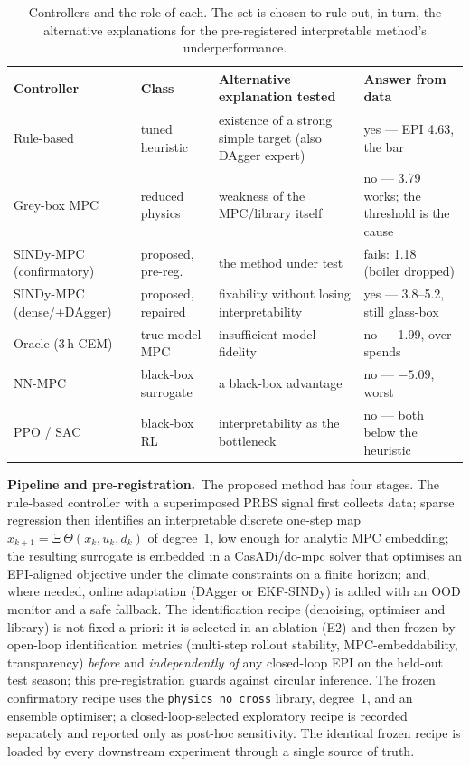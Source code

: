 \documentclass[preprint,3p]{elsarticle}
\begin{document}
\begin{table}[t]
\centering
\caption{Controllers and the role of each. The set is chosen to rule out, in turn, the
alternative explanations for the pre-registered interpretable method's underperformance.}
\label{tab:controllers}
\small
\begin{tabular}{@{}p{3.0cm}p{2.4cm}p{5.2cm}p{4.0cm}@{}}
\toprule
Controller & Class & Alternative explanation tested & Answer from data \\
\midrule
Rule-based & tuned heuristic & existence of a strong simple target (also DAgger expert) & yes --- EPI 4.63, the bar \\
Grey-box MPC & reduced physics & weakness of the MPC/library itself & no --- 3.79 works; the threshold is the cause \\
SINDy-MPC (confirmatory) & proposed, pre-reg. & the method under test & fails: 1.18 (boiler dropped) \\
SINDy-MPC (dense/+DAgger) & proposed, repaired & fixability without losing interpretability & yes --- 3.8--5.2, still glass-box \\
Oracle (3\,h CEM) & true-model MPC & insufficient model fidelity & no --- 1.99, over-spends \\
NN-MPC & black-box surrogate & a black-box advantage & no --- $-5.09$, worst \\
PPO / SAC & black-box RL & interpretability as the bottleneck & no --- both below the heuristic \\
\bottomrule
\end{tabular}
\end{table}

\textbf{Pipeline and pre-registration.}~The proposed method has four stages. The
rule-based controller with a superimposed PRBS signal first collects data; sparse
regression then identifies an interpretable discrete one-step map
$x_{k+1}=\Xi\,\Theta(x_k,u_k,d_k)$ of degree~1, low enough for analytic MPC embedding;
the resulting surrogate is embedded in a CasADi/do-mpc solver that optimises an
EPI-aligned objective under the climate constraints on a finite horizon; and, where
needed, online adaptation (DAgger or EKF-SINDy) is added with an OOD monitor and a
safe fallback. The identification recipe
(denoising, optimiser and library) is not fixed a priori: it is selected in an
ablation (E2) and then frozen by open-loop identification metrics (multi-step rollout
stability, MPC-embeddability, transparency) \emph{before} and \emph{independently of}
any closed-loop EPI on the held-out test season; this pre-registration guards against
circular inference. The frozen confirmatory recipe uses the \texttt{physics\_no\_cross}
library, degree~1, and an ensemble optimiser; a closed-loop-selected exploratory
recipe is recorded separately and reported only as post-hoc sensitivity. The identical
frozen recipe is loaded by every downstream experiment through a single source of truth.
\end{document}
